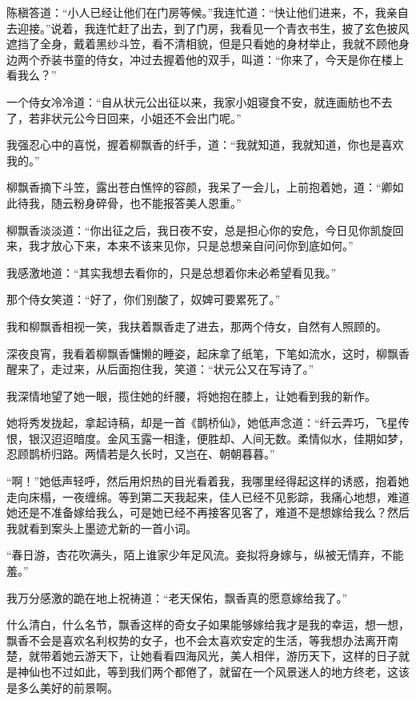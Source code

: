 陈稹答道：“小人已经让他们在门房等候。”我连忙道：“快让他们进来，不，我亲自去迎接。”说着，我连忙赶了出去，到了门房，我看见一个青衣书生，披了玄色披风遮挡了全身，戴着黑纱斗笠，看不清相貌，但是只看她的身材举止，我就不顾他身边两个乔装书童的侍女，冲过去握着他的双手，叫道：“你来了，今天是你在楼上看我么？”

一个侍女冷冷道：“自从状元公出征以来，我家小姐寝食不安，就连画舫也不去了，若非状元公今日回来，小姐还不会出门呢。”

我强忍心中的喜悦，握着柳飘香的纤手，道：“我就知道，我就知道，你也是喜欢我的。”

柳飘香摘下斗笠，露出苍白憔悴的容颜，我呆了一会儿，上前抱着她，道：“卿如此待我，随云粉身碎骨，也不能报答美人恩重。”

柳飘香淡淡道：“你出征之后，我日夜不安，总是担心你的安危，今日见你凯旋回来，我才放心下来，本来不该来见你，只是总想亲自问问你到底如何。”

我感激地道：“其实我想去看你的，只是总想着你未必希望看见我。”

那个侍女笑道：“好了，你们别酸了，奴婢可要累死了。”

我和柳飘香相视一笑，我扶着飘香走了进去，那两个侍女，自然有人照顾的。

深夜良宵，我看着柳飘香慵懒的睡姿，起床拿了纸笔，下笔如流水，这时，柳飘香醒来了，走过来，从后面抱住我，笑道：“状元公又在写诗了。”

我深情地望了她一眼，揽住她的纤腰，将她抱在膝上，让她看到我的新作。

她将秀发拢起，拿起诗稿，却是一首《鹊桥仙》，她低声念道：“纤云弄巧，飞星传恨，银汉迢迢暗度。金风玉露一相逢，便胜却、人间无数。柔情似水，佳期如梦，忍顾鹊桥归路。两情若是久长时，又岂在、朝朝暮暮。”

“啊！”她低声轻呼，然后用炽热的目光看着我，我哪里经得起这样的诱惑，抱着她走向床榻，一夜缠绵。等到第二天我起来，佳人已经不见影踪，我痛心地想，难道她还是不准备嫁给我么，可是她已经不再接客见客了，难道不是想嫁给我么？然后我就看到案头上墨迹尤新的一首小词。

“春日游，杏花吹满头，陌上谁家少年足风流。妾拟将身嫁与，纵被无情弃，不能羞。”

我万分感激的跪在地上祝祷道：“老天保佑，飘香真的愿意嫁给我了。”

什么清白，什么名节，飘香这样的奇女子如果能够嫁给我才是我的幸运，想一想，飘香不会是喜欢名利权势的女子，也不会太喜欢安定的生活，等我想办法离开南楚，就带着她云游天下，让她看看四海风光，美人相伴，游历天下，这样的日子就是神仙也不过如此，等到我们两个都倦了，就留在一个风景迷人的地方终老，这该是多么美好的前景啊。

